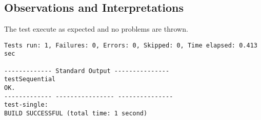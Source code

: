 
\subsection{Observations and Interpretations}

\par
The test execute as expected and no problems are thrown.
\begin{lstlisting}[frame=single,breaklines=true]
Tests run: 1, Failures: 0, Errors: 0, Skipped: 0, Time elapsed: 0.413 sec

------------- Standard Output ---------------
testSequential
OK.
------------- ---------------- ---------------
test-single:
BUILD SUCCESSFUL (total time: 1 second)

\end{lstlisting}

